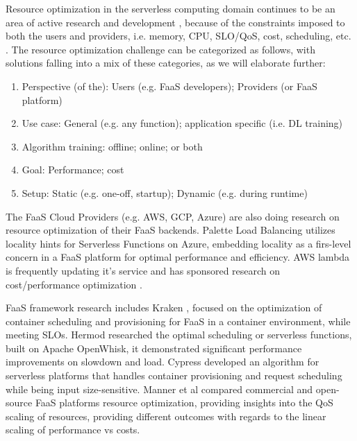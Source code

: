 \documentclass[conference]{IEEEtran}
\begin{document}
Resource optimization in the serverless computing domain continues to be an area of active research and development \cite{10.1145/3587249, 10.1145/3406011, 9756233}, because of the constraints imposed to both the users and providers, i.e. memory, CPU, SLO/QoS, cost, scheduling, etc. \cite{10181224, 10.1145/3542929.3563469, 9860980, 9460548, 10.1145/3429880.3430099}. The resource optimization challenge can be categorized as follows, with solutions falling into a mix of these categories, as we will elaborate further:

\begin{enumerate}
    \item Perspective (of the): Users (e.g. FaaS developers); Providers (or FaaS platform)
    \item Use case: General (e.g. any function); application specific (i.e. DL training)
    \item Algorithm training: offline; online; or both
    \item Goal: Performance; cost
    \item Setup: Static (e.g. one-off, startup); Dynamic (e.g. during runtime)
\end{enumerate}

The FaaS Cloud Providers (e.g. AWS, GCP, Azure) are also doing research on resource optimization of their FaaS backends. Palette Load Balancing \cite{10.1145/3552326.3567496} utilizes locality hints for Serverless Functions on Azure, embedding locality as a firs-level concern in a FaaS platform for optimal performance and efficiency. AWS lambda is frequently updating it's service \cite{aws_new} and has sponsored research on cost/performance optimization \cite{aws_operating_lambda_performance_optimization}.

FaaS framework research includes Kraken \cite{10.1145/3472883.3486992}, focused on the optimization of container scheduling and provisioning for FaaS in a container environment, while meeting SLOs. Hermod \cite{10.1145/3542929.3563468} researched the optimal scheduling or serverless functions, built on Apache OpenWhisk, it demonstrated significant performance improvements on slowdown and load. Cypress \cite{10.1145/3542929.3563464} developed an algorithm for serverless platforms that handles container provisioning and request scheduling while being input size-sensitive. Manner et al \cite{9860370} compared commercial and open-source FaaS platforms resource optimization, providing insights into the QoS scaling of resources, providing different outcomes with regards to the linear scaling of performance vs costs.
\end{document}
